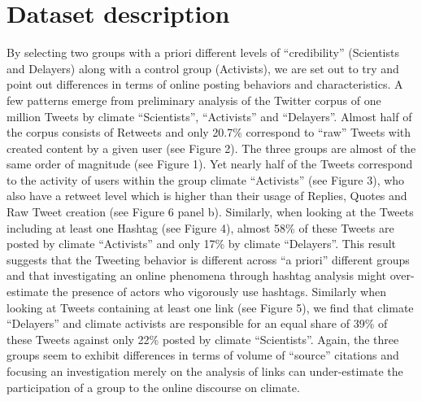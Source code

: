 \documentclass{article}
\begin{document}
\section{Dataset description}
By selecting two groups with a priori different levels of “credibility”  (Scientists and Delayers) along with a control group (Activists), we are set out to try and point out differences in terms of online posting behaviors and characteristics. 
A few patterns emerge from preliminary analysis of the Twitter corpus of one million Tweets by climate “Scientists”, “Activists” and “Delayers”. Almost half of the corpus consists of Retweets and only 20.7\% correspond to “raw” Tweets with created content by a given user (see Figure 2). The three groups are almost of the same order of magnitude (see Figure 1). Yet nearly half of the Tweets correspond to the activity of users within the group climate “Activists” (see Figure 3), who also have a retweet level which is higher than their usage of Replies, Quotes and Raw Tweet creation (see Figure 6 panel b). Similarly, when looking at the Tweets including at least one Hashtag (see Figure 4), almost 58\% of these Tweets are posted by climate “Activists” and only 17\% by climate “Delayers”. This result suggests that the Tweeting behavior is different across “a priori” different groups and that investigating an online phenomena through hashtag analysis might over-estimate the presence of actors who vigorously use hashtags. Similarly when looking at Tweets containing at least one link (see Figure 5), we find that climate “Delayers” and climate activists are responsible for an equal share of 39\% of these Tweets against only 22\% posted by climate “Scientists”. Again, the three groups seem to exhibit differences in terms of volume of “source” citations and focusing an investigation merely on the analysis of links can under-estimate the participation of a group to the online discourse on climate. 
\end{document}
